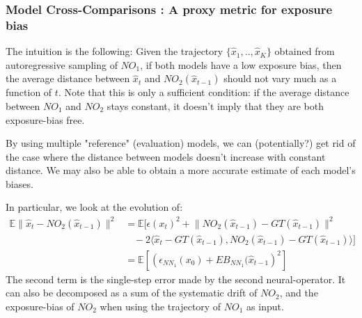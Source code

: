 \documentclass{article}
\begin{document}
\subsubsection{Model Cross-Comparisons : A proxy metric for exposure bias}

The intuition is the following: Given the trajectory $\{\hat{x}_1, .., \hat{x}_K\}$ obtained from autoregressive sampling of $NO_1$, if both models have a low exposure bias, then the average distance between $\hat{x}_t$ and $NO_2(\hat{x}_{t-1})$ should not vary much as a function of $t$. 
Note that this is only a sufficient condition: if the average distance between $NO_1$ and $NO_2$ stays constant, it doesn't imply that they are both exposure-bias free.

By using multiple "reference" (evaluation) models, we can (potentially?) get rid of the case where the distance between models doesn't increase with constant distance. We may also be able to obtain a more accurate estimate of each model's biases.

In particular, we look at the evolution of: 
\begin{align}
    \mathbb{E} \lVert \hat{x}_t - NO_2(\hat{x}_{t-1}) \rVert^2 &= \mathbb{E} [ \epsilon(x_t)^2  + \lVert NO_2(\hat{x}_{t-1}) - GT(\hat{x}_{t-1}) \rVert^2 \\ &  \ \ \ \ - 2 \langle\hat{x}_t  - GT(\hat{x}_{t-1}), NO_2(\hat{x}_{t-1}) - GT(\hat{x}_{t-1})\rangle ] \\
    &= \mathbb{E}\left[\left(\epsilon_{NN_1}(x_0) + EB_{NN_1}(\hat{x}_{t-1}\right)^2\right]
\end{align}
The second term is the single-step error made by the second neural-operator. It can also be decomposed as a sum of the systematic drift of $NO_2$, and the exposure-bias of $NO_2$ when using the trajectory of $NO_1$ as input.
\end{document}

